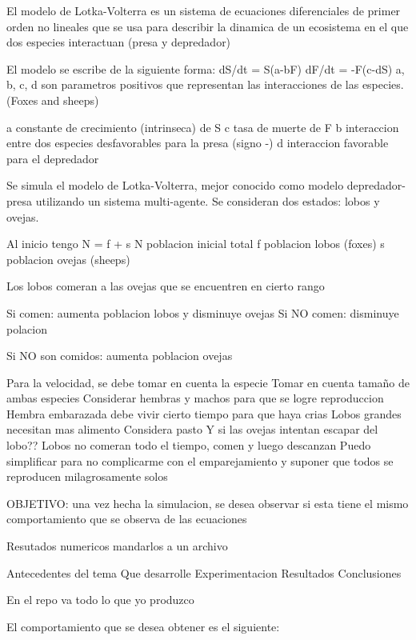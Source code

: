 El modelo de Lotka-Volterra es un sistema de ecuaciones diferenciales de primer orden no lineales que se usa para describir la dinamica de un ecosistema en el que dos especies interactuan (presa y depredador)

El modelo se escribe de la siguiente forma:
dS/dt = S(a-bF)
dF/dt = -F(c-dS) 
a, b, c, d son parametros positivos que representan las interacciones de las especies.
(Foxes and sheeps)

a constante de crecimiento (intrinseca) de S
c tasa de muerte de F
b interaccion entre dos especies desfavorables para la presa (signo -)
d interaccion favorable para el depredador



Se simula el modelo de Lotka-Volterra, mejor conocido como modelo depredador-presa utilizando un sistema multi-agente.
Se consideran dos estados: lobos y ovejas.

Al inicio tengo N = f + s
N poblacion inicial total
f poblacion lobos (foxes)
s poblacion ovejas (sheeps)

Los lobos comeran a las ovejas que se encuentren en cierto rango

Si comen: aumenta poblacion lobos y disminuye ovejas
Si NO comen: disminuye polacion

Si NO son comidos: aumenta poblacion ovejas


Para la velocidad, se debe tomar en cuenta la especie
Tomar en cuenta tamaño de ambas especies
Considerar hembras y machos para que se logre reproduccion
Hembra embarazada debe vivir cierto tiempo para que haya crias
Lobos grandes necesitan mas alimento
Considera pasto
Y si las ovejas intentan escapar del lobo??
Lobos no comeran todo el tiempo, comen y luego descanzan
Puedo simplificar para no complicarme con el emparejamiento y suponer que todos se reproducen milagrosamente solos

OBJETIVO:
una vez hecha la simulacion, se desea observar si esta tiene el mismo comportamiento que se observa de las ecuaciones

Resutados numericos mandarlos a un archivo

Antecedentes del tema
Que desarrolle
Experimentacion
Resultados
Conclusiones

En el repo va todo lo que yo produzco


El comportamiento que se desea obtener es el siguiente:

